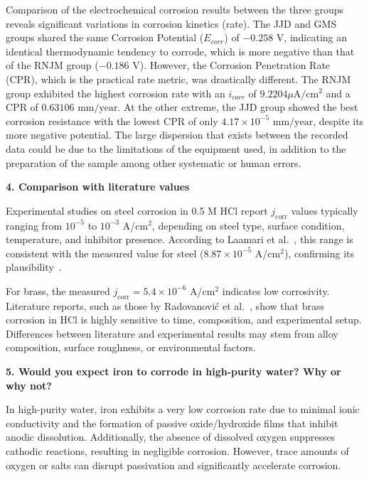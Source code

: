 Comparison of the electrochemical corrosion results between the three groups reveals significant variations in corrosion kinetics (rate). The JJD and GMS groups shared the same Corrosion Potential ($E_{corr}$) of $-0.258 \text{ V}$, indicating an identical thermodynamic tendency to corrode, which is more negative than that of the RNJM group ($-0.186 \text{ V}$). However, the Corrosion Penetration Rate (CPR), which is the practical rate metric, was drastically different. The RNJM group exhibited the highest corrosion rate with an $i_{corr}$ of $9.2204 \mu\text{A}/\text{cm}^2$ and a CPR of $0.63106 \text{ mm/year}$. At the other extreme, the JJD group showed the best corrosion resistance with the lowest CPR of only $4.17 \times 10^{-5} \text{ mm/year}$, despite its more negative potential.
The large dispersion that exists between the recorded data could be due to the limitations of the equipment used, in addition to the preparation of the sample among other systematic or human errors.



\vspace{0.5cm}

\textbf{4. Comparison with literature values}

Experimental studies on steel corrosion in 0.5 M HCl report \( j_{\text{corr}} \) values typically ranging from \( 10^{-5} \) to \( 10^{-3} \) A/cm\(^2\), depending on steel type, surface condition, temperature, and inhibitor presence. According to Laamari et al.~\cite{laamari_2011_corrosion}, this range is consistent with the measured value for steel (\( 8.87 \times 10^{-5} \) A/cm\(^2\)), confirming its plausibility~\cite{loveday_electrochemical}.

For brass, the measured \( j_{\text{corr}} = 5.4 \times 10^{-6} \) A/cm\(^2\) indicates low corrosivity. Literature reports, such as those by Radovanović et al.~\cite{radovanovi_2019_electrochemical}, show that brass corrosion in HCl is highly sensitive to time, composition, and experimental setup. Differences between literature and experimental results may stem from alloy composition, surface roughness, or environmental factors.

\vspace{0.5cm}

\textbf{5. Would you expect iron to corrode in high-purity water? Why or why not?}

In high-purity water, iron exhibits a very low corrosion rate due to minimal ionic conductivity and the formation of passive oxide/hydroxide films that inhibit anodic dissolution. Additionally, the absence of dissolved oxygen suppresses cathodic reactions, resulting in negligible corrosion. However, trace amounts of oxygen or salts can disrupt passivation and significantly accelerate corrosion.

